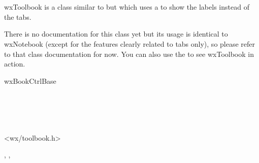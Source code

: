 
\section{}\label{wxtoolbook}

wxToolbook is a class similar to  but which
uses a  to show the labels instead of the
tabs.

There is no documentation for this class yet but its usage is
identical to wxNotebook (except for the features clearly related to tabs
only), so please refer to that class documentation for now. You can also
use the  to see wxToolbook in action.


wxBookCtrlBase\\
\\
\\
\\
\\


<wx/toolbook.h>


\twocolwidtha{5cm}
\begin{twocollist}\itemsep=0pt

\end{twocollist}


, , 

